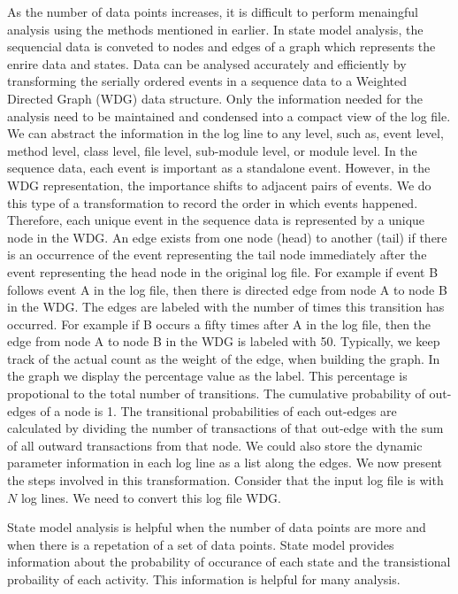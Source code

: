 As the number of data points increases, it is difficult to perform menaingful analysis using the methods mentioned in earlier. In state model analysis, the sequencial data is conveted to nodes and edges of a graph which represents the enrire data and states. Data can be analysed accurately and efficiently by transforming the serially ordered events in a sequence data to a Weighted Directed Graph (WDG) data structure. Only the information needed for the analysis need to be maintained and condensed into a compact view of the log file. We can abstract the information in the log line to any level, such as, event level, method level, class level, file level, sub-module level, or module level. In the sequence data, each event is important as a standalone event. However, in the WDG representation, the importance shifts to adjacent pairs of events. We do this type of a transformation to record the order in which events happened. Therefore, each unique event in the sequence data is represented by a unique node in the WDG. An edge exists from one node (head) to another (tail) if there is an occurrence of the event representing the tail node immediately after the event representing the head node in the original log file. For example if event B follows event A in the log file, then there is directed edge from node A to node B in the WDG. The edges are labeled with the number of times this transition has occurred.  For example if B occurs a fifty times after A in the log file, then the edge from node A to node B in the WDG is labeled with 50. Typically, we keep track of the actual count as the weight of the edge, when building the graph. In the graph we display the percentage value as the label. This percentage is propotional to the total number of transitions.  The cumulative probability of out-edges of a node is 1. The transitional probabilities of each out-edges are calculated by dividing the number of transactions of that out-edge with the sum of all outward transactions from that node. We could also store the dynamic parameter information in each log line as a list along the edges. We now present the steps involved in this transformation. Consider that the input log file is with $N$ log lines. We need to convert this log file WDG.

State model analysis is helpful when the number of data points are more and when there is a repetation of a set of data points. State model provides information about the probability of occurance of each state and the transistional probaility of each activity. This information is helpful for many analysis. 

